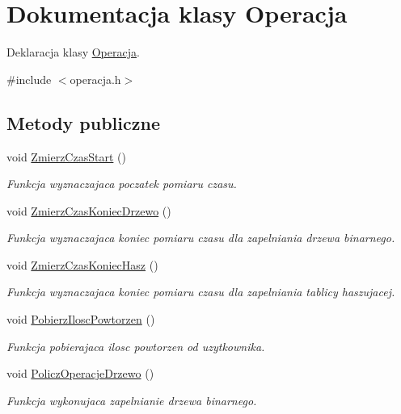 \hypertarget{class_operacja}{\section{Dokumentacja klasy Operacja}
\label{class_operacja}
}


Deklaracja klasy \hyperlink{class_operacja}{Operacja}.  




{\ttfamily \#include $<$operacja.\-h$>$}

\subsection*{Metody publiczne}
\begin{DoxyCompactItemize}
\item 
void \hyperlink{class_operacja_a8a31476894d307c400f965dd3dfcbb46}{Zmierz\-Czas\-Start} ()
\begin{DoxyCompactList}\small\item\em Funkcja wyznaczajaca poczatek pomiaru czasu. \end{DoxyCompactList}\item 
void \hyperlink{class_operacja_a971e3493bec71fc140ac44f74bd92998}{Zmierz\-Czas\-Koniec\-Drzewo} ()
\begin{DoxyCompactList}\small\item\em Funkcja wyznaczajaca koniec pomiaru czasu dla zapelniania drzewa binarnego. \end{DoxyCompactList}\item 
void \hyperlink{class_operacja_a39ea8e62797c94693c75abe6f0416035}{Zmierz\-Czas\-Koniec\-Hasz} ()
\begin{DoxyCompactList}\small\item\em Funkcja wyznaczajaca koniec pomiaru czasu dla zapelniania tablicy haszujacej. \end{DoxyCompactList}\item 
void \hyperlink{class_operacja_a3f6cb38d924c260711fad70fe0eed35f}{Pobierz\-Ilosc\-Powtorzen} ()
\begin{DoxyCompactList}\small\item\em Funkcja pobierajaca ilosc powtorzen od uzytkownika. \end{DoxyCompactList}\item 
void \hyperlink{class_operacja_aca61c478012e3477b123b1cccedd375c}{Policz\-Operacje\-Drzewo} ()
\begin{DoxyCompactList}\small\item\em Funkcja wykonujaca zapelnianie drzewa binarnego. \end{DoxyCompactList}\item 

\end{DoxyCompactItemize}

